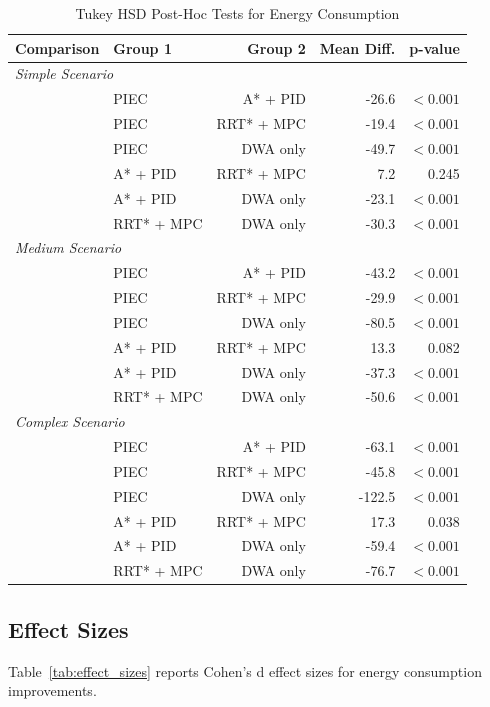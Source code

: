\begin{table}[htbp]
\centering
\caption{Tukey HSD Post-Hoc Tests for Energy Consumption}
\label{tab:posthoc_energy}
\begin{tabular}{@{}llrrr@{}}
\toprule
\textbf{Comparison} & \textbf{Group 1} & \textbf{Group 2} & \textbf{Mean Diff.} & \textbf{p-value} \\
\midrule
\multicolumn{5}{l}{\textit{Simple Scenario}} \\
& PIEC & A* + PID & -26.6 & $< 0.001$ \\
& PIEC & RRT* + MPC & -19.4 & $< 0.001$ \\
& PIEC & DWA only & -49.7 & $< 0.001$ \\
& A* + PID & RRT* + MPC & 7.2 & 0.245 \\
& A* + PID & DWA only & -23.1 & $< 0.001$ \\
& RRT* + MPC & DWA only & -30.3 & $< 0.001$ \\
\midrule
\multicolumn{5}{l}{\textit{Medium Scenario}} \\
& PIEC & A* + PID & -43.2 & $< 0.001$ \\
& PIEC & RRT* + MPC & -29.9 & $< 0.001$ \\
& PIEC & DWA only & -80.5 & $< 0.001$ \\
& A* + PID & RRT* + MPC & 13.3 & 0.082 \\
& A* + PID & DWA only & -37.3 & $< 0.001$ \\
& RRT* + MPC & DWA only & -50.6 & $< 0.001$ \\
\midrule
\multicolumn{5}{l}{\textit{Complex Scenario}} \\
& PIEC & A* + PID & -63.1 & $< 0.001$ \\
& PIEC & RRT* + MPC & -45.8 & $< 0.001$ \\
& PIEC & DWA only & -122.5 & $< 0.001$ \\
& A* + PID & RRT* + MPC & 17.3 & 0.038 \\
& A* + PID & DWA only & -59.4 & $< 0.001$ \\
& RRT* + MPC & DWA only & -76.7 & $< 0.001$ \\
\bottomrule
\end{tabular}
\end{table}

\subsection{Effect Sizes}

Table~\ref{tab:effect_sizes} reports Cohen's d effect sizes for energy consumption improvements.

